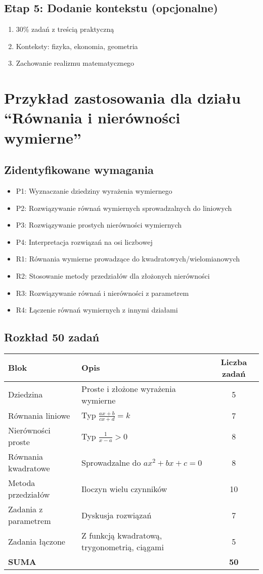 \documentclass[12pt,a4paper]{article}
\begin{document}
\subsection{Etap 5: Dodanie kontekstu (opcjonalne)}
\begin{enumerate}
    \item 30\% zadań z treścią praktyczną
    \item Konteksty: fizyka, ekonomia, geometria
    \item Zachowanie realizmu matematycznego
\end{enumerate}

\section{Przykład zastosowania dla działu ``Równania i nierówności wymierne''}

\subsection{Zidentyfikowane wymagania}
\begin{itemize}
    \item P1: Wyznaczanie dziedziny wyrażenia wymiernego
    \item P2: Rozwiązywanie równań wymiernych sprowadzalnych do liniowych
    \item P3: Rozwiązywanie prostych nierówności wymiernych
    \item P4: Interpretacja rozwiązań na osi liczbowej
    \item R1: Równania wymierne prowadzące do kwadratowych/wielomianowych
    \item R2: Stosowanie metody przedziałów dla złożonych nierówności
    \item R3: Rozwiązywanie równań i nierówności z parametrem
    \item R4: Łączenie równań wymiernych z innymi działami
\end{itemize}

\subsection{Rozkład 50 zadań}
\begin{longtable}{|l|l|c|}
\hline
\textbf{Blok} & \textbf{Opis} & \textbf{Liczba zadań} \\
\hline
\endhead
Dziedzina & Proste i złożone wyrażenia wymierne & 5 \\
Równania liniowe & Typ $\frac{ax+b}{cx+d} = k$ & 7 \\
Nierówności proste & Typ $\frac{1}{x-a} > 0$ & 8 \\
Równania kwadratowe & Sprowadzalne do $ax^2+bx+c=0$ & 8 \\
Metoda przedziałów & Iloczyn wielu czynników & 10 \\
Zadania z parametrem & Dyskusja rozwiązań & 7 \\
Zadania łączone & Z funkcją kwadratową, trygonometrią, ciągami & 5 \\
\hline
\textbf{SUMA} & & \textbf{50} \\
\hline
\end{longtable}
\end{document}
